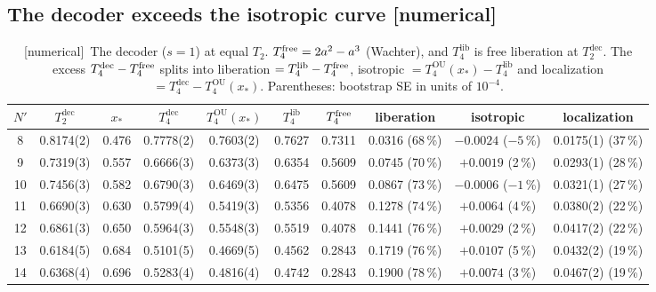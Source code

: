\documentclass[11pt]{article}
\newcommand{\Np}{N'}
\newcommand{\lib}{\mathrm{lib}}
\newcommand{\OU}{\mathrm{OU}}
\newcommand{\dec}{\mathrm{dec}}
\newcommand{\tagbox}[2]{\textsf{\small\color{#1}[#2]}}
\newcommand{\NUM}{\tagbox{cnum}{numerical}}
\theoremstyle{remark}
\begin{document}
\subsection{The decoder exceeds the isotropic curve \NUM}
\begin{table}[!htbp]
\centering\footnotesize
\setlength{\tabcolsep}{2.6pt}
\begin{tabular}{@{}cccccccccc@{}}
\toprule
$\Np$ & $T_2^\dec$ & $x_*$ & $T_4^\dec$ & $T_4^\OU(x_*)$ & $T_4^\lib$ & $T_4^{\rm free}$ & liberation & isotropic & localization\\
\midrule
8 & 0.8174(2) & 0.476 & 0.7778(2) & 0.7603(2) & 0.7627 & 0.7311 & 0.0316 (68\,\%) & $-0.0024$ ($-5$\,\%) & 0.0175(1) (37\,\%)\\
9 & 0.7319(3) & 0.557 & 0.6666(3) & 0.6373(3) & 0.6354 & 0.5609 & 0.0745 (70\,\%) & $+0.0019$ (2\,\%) & 0.0293(1) (28\,\%)\\
10 & 0.7456(3) & 0.582 & 0.6790(3) & 0.6469(3) & 0.6475 & 0.5609 & 0.0867 (73\,\%) & $-0.0006$ ($-1$\,\%) & 0.0321(1) (27\,\%)\\
11 & 0.6690(3) & 0.630 & 0.5799(4) & 0.5419(3) & 0.5356 & 0.4078 & 0.1278 (74\,\%) & $+0.0064$ (4\,\%) & 0.0380(2) (22\,\%)\\
12 & 0.6861(3) & 0.650 & 0.5964(3) & 0.5548(3) & 0.5519 & 0.4078 & 0.1441 (76\,\%) & $+0.0029$ (2\,\%) & 0.0417(2) (22\,\%)\\
13 & 0.6184(5) & 0.684 & 0.5101(5) & 0.4669(5) & 0.4562 & 0.2843 & 0.1719 (76\,\%) & $+0.0107$ (5\,\%) & 0.0432(2) (19\,\%)\\
14 & 0.6368(4) & 0.696 & 0.5283(4) & 0.4816(4) & 0.4742 & 0.2843 & 0.1900 (78\,\%) & $+0.0074$ (3\,\%) & 0.0467(2) (19\,\%)\\
\bottomrule
\end{tabular}
\caption{\NUM\ The decoder ($s=1$) at equal $T_2$. $T_4^{\rm free}=2a^2-a^3$ (Wachter), and $T_4^\lib$ is free liberation
at $T_2^\dec$. The excess $T_4^\dec-T_4^{\rm free}$ splits into liberation $=T_4^\lib-T_4^{\rm free}$, isotropic
$=T_4^\OU(x_*)-T_4^\lib$ and localization $=T_4^\dec-T_4^\OU(x_*)$. Parentheses: bootstrap SE in units of
$10^{-4}$.}
\label{tab:split}
\end{table}
\end{document}
